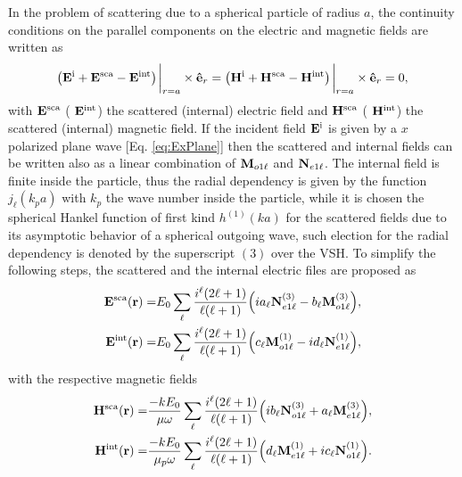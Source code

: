 In the problem of scattering due to a spherical particle of radius $a$, the continuity conditions on the parallel components on the electric and magnetic fields are written as
 \begin{align}
 \qty(\vb{E}^\text{i} + \vb{E}^\text{sca}- \vb{E}^\text{int})\eval_{r=a}\times \vu{e}_r  =
  \qty(\vb{H}^\text{i} + \vb{H}^\text{sca} - \vb{H}^\text{int})\eval_{r=a} \times\vu{e}_r = 0,
  \label{eq:contuinity}
 \end{align}
with  $\vb{E}^\text{sca}$ ( $\vb{E}^\text{int}$) the scattered (internal) electric field and  $\vb{H}^\text{sca}$ ( $\vb{H}^\text{int}$) the scattered (internal) magnetic field. If the incident field $\vb{E}^\text{i}$ is given by a $x$ polarized plane wave [Eq. \eqref{eq:ExPlane}] then the scattered and internal fields can be written also as a linear combination of $\vb{M}_{o1\ell}$ and $\vb{N}_{e1\ell}$. The internal field is finite inside the particle, thus the radial dependency is given by the function $j_\ell(k_p a)$ with $k_p$ the wave number inside the particle, while it is chosen the spherical Hankel function of first kind $h^{(1)}(ka)$  for the scattered fields due to its asymptotic behavior of a spherical outgoing wave, such election for the radial dependency is denoted by the superscript $(3)$ over the VSH. To simplify the following steps, the scattered and the internal electric files are proposed as
  \begin{subequations}
 \begin{align}
 \vb{E}^\text{sca} (\vb{r})=& E_0 \sum_\ell\frac{i^\ell(2\ell+1)}{\ell(\ell+1)}\qty(i a_\ell \vb{N}_{e1\ell}^{(3)} -b_\ell \vb{M}_{o1\ell}^{(3)}),
 \label{eq:EscaLC}\\
 \vb{E}^\text{int} (\vb{r})=& E_0 \sum_\ell\frac{i^\ell(2\ell+1)}{\ell(\ell+1)}\qty( c_\ell\vb{M}_{o1\ell}^{(1)} - i d_\ell \vb{N}_{e1\ell}^{(1)}),
 \end{align}
 \label{eq:EscaInt}
 \end{subequations}
with the respective magnetic fields
    \begin{subequations}
 \begin{align}
 \vb{H}^\text{sca} (\vb{r})=& \frac{-kE_0}{\mu\omega} \sum_\ell\frac{i^\ell(2\ell+1)}{\ell(\ell+1)}\qty(i b_\ell \vb{N}_{o1\ell}^{(3)} +a_\ell \vb{M}_{e1\ell}^{(3)}),\\
 \vb{H}^\text{int} (\vb{r})=& \frac{-kE_0}{\mu_p\omega} \sum_\ell\frac{i^\ell(2\ell+1)}{\ell(\ell+1)}\qty( d_\ell\vb{M}_{e1\ell}^{(1)} + i c_\ell \vb{N}_{o1\ell}^{(1)}).
 \end{align}%
\label{eq:HscaInt}%
 \end{subequations}%
